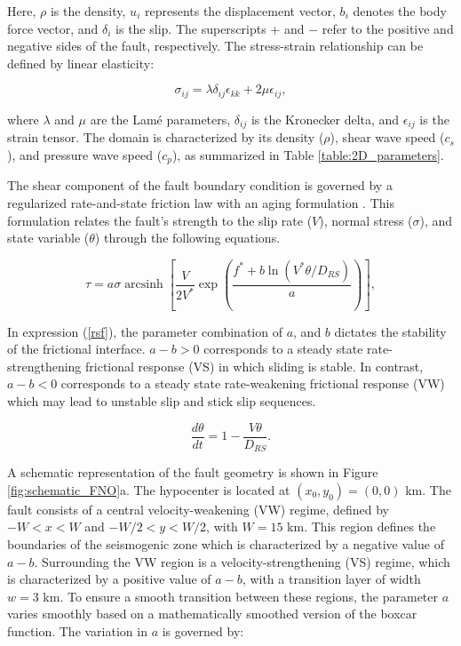 \documentclass[draft]{agujournal2019}
\DeclareMathOperator{\arcsinh}{arcsinh}
\begin{document}
Here, \( \rho \) is the density, \( u_i \) represents the displacement vector, \( b_i \) denotes the body force vector, and \( \delta_i \) is the slip. The superscripts \( + \) and \( - \) refer to the positive and negative sides of the fault, respectively. The stress-strain relationship can be defined by linear elasticity:

\begin{equation}
\sigma_{ij} = \lambda \delta_{ij} \epsilon_{kk} + 2\mu \epsilon_{ij},
\end{equation}

where \( \lambda \) and \( \mu \) are the Lamé parameters, \( \delta_{ij} \) is the Kronecker delta, and \( \epsilon_{ij} \) is the strain tensor. The domain is characterized by its density (\(\rho\)), shear wave speed (\(c_s\)), and pressure wave speed (\(c_p\)), as summarized in Table \ref{table:2D_parameters}.

The shear component of the fault boundary condition is governed by a regularized rate-and-state friction law with an aging formulation \cite{dieterich1979modeling,ruina1983slip,ben1997dynamic,lapusta2000elastodynamic,ampuero2008earthquake}. This formulation relates the fault's strength to the slip rate (\(V\)), normal stress (\(\sigma\)), and state variable (\(\theta\)) through the following equations.

\begin{equation}
\tau = a \sigma \arcsinh \left[ \frac{V}{2V^*} \exp\left(\frac{f^* + b \ln(V^* \theta / D_{RS})}{a}\right) \right],
\label{rsf}
\end{equation}

In expression (\ref{rsf}), the parameter combination of $a$, and $b$ dictates the stability of the frictional interface. $a-b>0$ corresponds to a steady state rate-strengthening frictional response (VS) in which sliding is stable. In contrast, $a-b<0$ corresponds to a steady state rate-weakening frictional response (VW) which may lead to unstable slip and stick slip sequences.

\begin{equation}
\frac{d\theta}{dt} = 1 - \frac{V\theta}{D_{RS}}.
\end{equation}

A schematic representation of the fault geometry is shown in Figure \ref{fig:schematic_FNO}a. The hypocenter is located at \((x_0, y_0) = (0,0)\) km. The fault consists of a central velocity-weakening (VW) regime, defined by \(-W < x < W\) and \(-W/2 < y < W/2\), with \( W = 15 \) km. This region defines the boundaries of the seismogenic zone which is characterized by a negative value of \( a - b \). Surrounding the VW region is a velocity-strengthening (VS) regime, which is characterized by a positive value of \( a - b \), with a transition layer of width \( w = 3 \) km. To ensure a smooth transition between these regions, the parameter \( a \) varies smoothly based on a mathematically smoothed version of the boxcar function. The variation in \( a \) is governed by:
\end{document}
